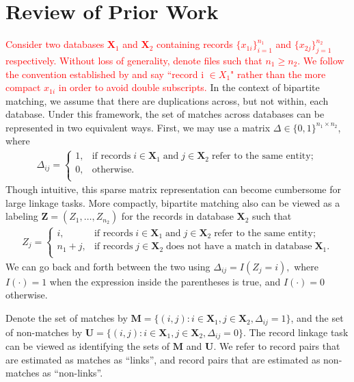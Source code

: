 \documentclass[ba]{imsart}
\begin{document}
\section{Review of Prior Work}
\label{sec:review-of_prior-work}

\textcolor{red}{Consider two databases $\bm{X}_1$ and $\bm{X}_2$ containing records $\{x_{1i}\}_{i=1}^{n_1}$ and $\{x_{2j}\}_{j=1}^{n_2}$ respectively. Without loss of generality, denote files such that $n_1 \geq n_2$. We follow the convention established by \cite{sadinle_bayesian_2017} and say ``record i $\in X_1$" rather than the more compact $x_{1i}$ in order to avoid double subscripts.} In the context of bipartite matching, we assume that there are duplications across, but not within, each database. Under this framework, the set of matches across databases can be represented in two equivalent ways. First, we may use a matrix $\Delta \in \{0, 1\}^{n_1 \times n_2}$, where
\begin{align}
	\Delta_{ij} =
	\begin{cases}
		1, & \text{if records}\;  i \in \bm{X}_1 \; \text{and}\; j\in \bm{X}_2 \; \text{refer to the same entity}; \\
		0, & \text{otherwise}.\\
	\end{cases}
\end{align}
Though intuitive, this sparse matrix representation can become cumbersome for large linkage tasks. More compactly, bipartite matching also can be viewed as a labeling $\bm{Z} = (Z_1, \ldots, Z_{n_2})$ for the records in database $\bm{X}_2$ such that 
\begin{align}
	Z_{j} =
	\begin{cases}
		i, & \text{if records}\;  i \in \bm{X}_1 \; \text{and}\; j\in \bm{X}_2 \; \text{refer to the same entity}; \\
		n_1 + j, & \text{if records}\;  j \in \bm{X}_2 \; \text{does not have a match in database}\; \bm{X}_1. \\
	\end{cases}
\end{align}
We can go back and forth between the two using $\Delta_{ij} = I(Z_j = i),$ where $I(\cdot) = 1$ when the expression inside the parentheses is true, and $I(\cdot) = 0$ otherwise. 

Denote the set of matches by $\bm{M} = \{(i,j): i \in \bm{X}_1, j \in \bm{X}_2, \Delta_{ij} = 1\}$, and the set of non-matches by 
$\bm{U} =  \{(i,j): i \in \bm{X}_1, j \in \bm{X}_2, \Delta_{ij} = 0\}.$ The record linkage task can be viewed as identifying the sets of  $\bm{M}$ and  $\bm{U}.$ We refer to record pairs that are estimated as matches as ``links'', and record pairs that are estimated as non-matches as ``non-links''.
\end{document}
